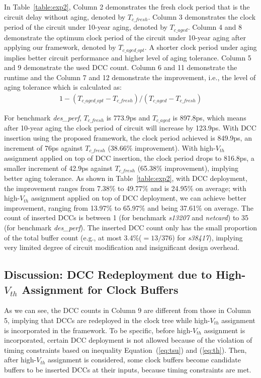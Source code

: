 In Table~\ref{table:exp2}, Column 2  demonstrates the fresh clock period that is the circuit delay without aging, denoted by $T_{c\_fresh}$. Column 3 demonstrates the clock period of the circuit under 10-year aging, denoted by $T_{c\_aged}$. Column 4 and 8 demonstrate the optimum clock period of the circuit under 10-year aging after applying our framework, denoted by $T_{c\_aged\_opt}$. A shorter clock period under aging implies better circuit performance and higher level of aging tolerance. Column 5 and 9 demonstrate the used DCC count. Column 6 and 11 demonstrate the runtime and the Column 7 and 12 demonstrate the improvement, i.e., the level of aging tolerance which is calculated as:
\begin{gather*}
1 - (T_{c\_aged\_opt} - T_{c\_fresh}) / (T_{c\_aged} - T_{c\_fresh})
\end{gather*}

For benchmark \textit{des\_perf}, $T_{c\_fresh}$ is 773.9ps and $T_{c\_aged}$ is 897.8ps, which means after 10-year aging the clock period of circuit will increase by 123.9ps. With DCC insertion using the proposed framework, the clock period achieved is 849.9ps, an increment of 76ps against $T_{c\_fresh}$ (38.66\% improvement). With high-$V_{th}$ assignment applied on top of DCC insertion, the clock period drops to 816.8ps, a smaller increment of 42.9ps against $T_{c\_fresh}$ (65.38\% improvement), implying better aging tolerance. As shown in Table~\ref{table:exp2}, with DCC deployment, the improvement ranges from 7.38\% to 49.77\% and is 24.95\% on average; with high-$V_{th}$ assignment applied on top of DCC deployment, we can achieve better improvement, ranging from 13.97\% to 65.97\% and being 37.61\% on average. The count of inserted DCCs is between 1 (for benchmark \textit{s13207} and \textit{netcard}) to 35 (for benchmark \textit{des\_perf}). The inserted DCC count only has the small proportion of the total buffer count (e.g., at most 3.4\%($= 13/376$) for \textit{s38417}), implying very limited degree of circuit modification and insignificant design overhead. %

\subsection{Discussion: DCC Redeployment due to High-$V_{th}$ Assignment for Clock Buffers}
As we can see, the DCC counts in Column 9 are different from those in Column 5, implying that DCCs are redeployed in the clock tree while high-$V_{th}$ assignment is incorporated in the framework. 
To be specific, before high-$V_{th}$ assignment is incorporated, certain DCC deployment is not allowed because of the violation of timing constraints based on inequality Equation~(\ref{eq:tsu}) and (\ref{eq:th}). Then, after high-$V_{th}$ assignment is considered, some clock buffers become candidate buffers to be inserted DCCs at their inputs, because timing constraints are met. 

